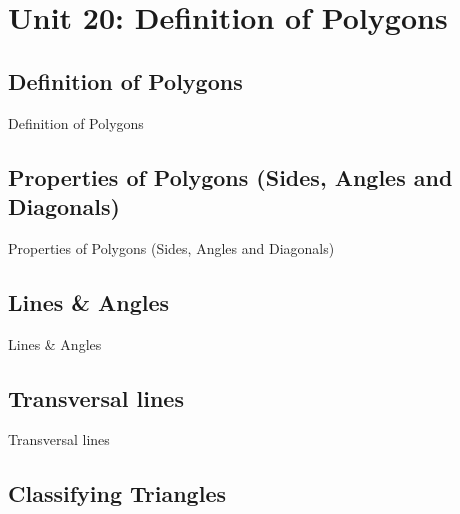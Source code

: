 \chapter{Unit 20: Definition of Polygons}
\label{chap:unit20}

\section{Definition of Polygons}
\label{sec:definition-of-polygons}

Definition of Polygons

\section{Properties of Polygons (Sides, Angles and Diagonals)}
\label{sec:properties-of-polygons-sides-angles-and-diagonals}

Properties of Polygons (Sides, Angles and Diagonals)

\section{Lines \& Angles}
\label{sec:lines-angles}

Lines \& Angles

\section{Transversal lines}
\label{sec:transversal-lines}

Transversal lines

\section{Classifying Triangles}
\label{sec:classifying-triangles}

